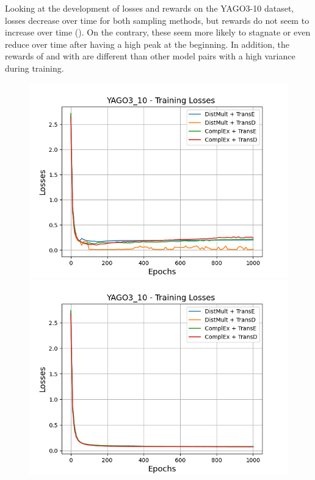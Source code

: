 Looking at the development of losses and rewards on the \textsc{YAGO3-10} dataset, losses decrease over time for both sampling methods, but rewards do not seem to increase over time ().
On the contrary, these seem more likely to stagnate or even reduce over time after having a high peak at the beginning.
In addition, the rewards of \distmult and \transd with \usmax are different than other model pairs with a high variance during training.
\begin{figure}[H]
    \centering
    \begin{minipage}{.5\textwidth}
      \centering
      \includegraphics[width=0.9\linewidth]{figures/results/gan_train/not_pretrained/uncertainty/max/entropy/yago3_10/1k_epochs/uncertainty_yago3_10_losses.png}
    \end{minipage}%
    \begin{minipage}{.5\textwidth}
      \centering
      \includegraphics[width=0.9\linewidth]{figures/results/gan_train/not_pretrained/uncertainty/max_distribution/entropy/yago3_10/1k_epochs/uncertainty_yago3_10_losses.png}

\end{minipage}
\end{figure}
